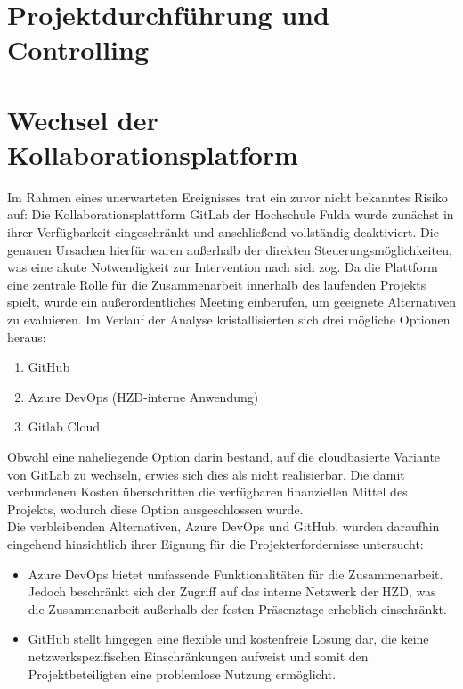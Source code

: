 \documentclass[12pt,oneside]{article}
\begin{document}
\section{Projektdurchführung und Controlling}

\section{Wechsel der Kollaborationsplatform}
Im Rahmen eines unerwarteten Ereignisses trat ein zuvor nicht bekanntes Risiko auf: Die Kollaborationsplattform GitLab der Hochschule Fulda wurde zunächst in ihrer Verfügbarkeit eingeschränkt und anschließend vollständig deaktiviert. Die genauen Ursachen hierfür waren außerhalb der direkten Steuerungsmöglichkeiten, was eine akute Notwendigkeit zur Intervention nach sich zog. 
Da die Plattform eine zentrale Rolle für die Zusammenarbeit innerhalb des laufenden Projekts spielt, wurde ein außerordentliches Meeting einberufen, um geeignete Alternativen zu evaluieren. Im Verlauf der Analyse kristallisierten sich drei mögliche Optionen heraus:

\begin{enumerate}
	\item GitHub
	\item Azure DevOps (HZD-interne Anwendung)
	\item Gitlab Cloud
\end{enumerate}

Obwohl eine naheliegende Option darin bestand, auf die cloudbasierte Variante von GitLab zu wechseln, erwies sich dies als nicht realisierbar. Die damit verbundenen Kosten überschritten die verfügbaren finanziellen Mittel des Projekts, wodurch diese Option ausgeschlossen wurde. \\

Die verbleibenden Alternativen, Azure DevOps und GitHub, wurden daraufhin eingehend hinsichtlich ihrer Eignung für die Projekterfordernisse untersucht:

\begin{itemize}
	\item Azure DevOps bietet umfassende Funktionalitäten für die Zusammenarbeit. Jedoch beschränkt sich der Zugriff auf das interne Netzwerk der HZD, was die Zusammenarbeit außerhalb der festen Präsenztage erheblich einschränkt.
	\item GitHub stellt hingegen eine flexible und kostenfreie Lösung dar, die keine netzwerkspezifischen Einschränkungen aufweist und somit den Projektbeteiligten eine problemlose Nutzung ermöglicht.
\end{itemize}
\end{document}
